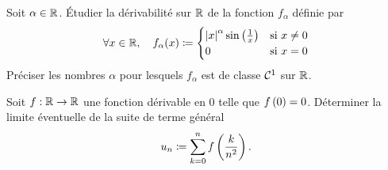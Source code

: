 \documentclass{magnolia}
\begin{document}

Soit $\alpha\in\mathbb{R}$. Étudier la dérivabilité sur $\mathbb{R}$ de la fonction $f_\alpha$
définie par
\[\forall x\in\mathbb{R} ,\quad f_\alpha(x)\coloneqq
  \begin{cases}
  \left|x\right|^\alpha \sin\left(\frac{1}{x}\right) & \text{si $x\neq 0$}\\
  0 & \text{si $x=0$}
  \end{cases}\]
Préciser les nombres $\alpha$ pour lesquels $f_\alpha$ est de classe
$\mathcal{C}^{1}$ sur $\mathbb{R}$.

Soit $f:\mathbb{R}\to\mathbb{R}$ une fonction dérivable en 0 telle que $f\left(0\right)=0$.
Déterminer la limite éventuelle de la suite de terme général
\[u_n\coloneqq \sum_{k=0}^n f\left(\frac{k}{n^2}\right).\]
\end{document}
